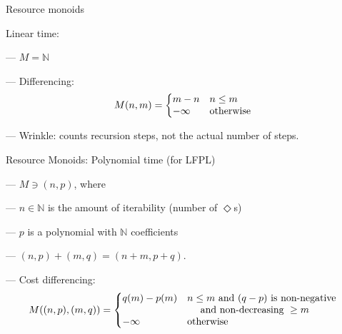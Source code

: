 \documentclass[xetex,serif,mathserif,aspectratio=169]{beamer}
\newcommand{\youtem}{\quad \textcolor{titlered!80}{---} \quad}
\newcommand{\HEAD}[1]{\textcolor{titlered}{#1}}
\begin{document}
\begin{frame}
  \HEAD{Resource monoids}

  \bigskip

  Linear time:

  \bigskip

  \youtem $M = \mathbb{N}$

  \smallskip

  \youtem Differencing:
  \begin{displaymath}
    M(n,m) = \left\{\begin{array}{@{}ll} m - n & n \leq m \\ -\infty & \textrm{otherwise} \end{array}\right.
  \end{displaymath}


  \youtem Wrinkle: counts recursion steps, not the actual number of
  steps.
\end{frame}

\begin{frame}
  \HEAD{Resource Monoids: } Polynomial time (for LFPL)

  \bigskip

  \youtem $M \ni (n, p)$, where \\

  \smallskip

  \quad \youtem $n \in \mathbb{N}$ is the amount of iterability (number of $\Diamond$s)

  \smallskip

  \quad \youtem $p$ is a polynomial with $\mathbb{N}$ coefficients

  \smallskip

  \quad \youtem $(n,p)+(m,q) = (n+m,p+q)$.

  \smallskip

  \quad \youtem Cost differencing:
  \begin{displaymath}
    M((n,p),(m,q)) = \left\{\begin{array}{@{}ll}
                              q(m) - p(m) & n \leq m\textrm{ and }(q-p)\textrm{ is non-negative}\\
                              &\quad\textrm{ and non-decreasing }\geq m \\
                              -\infty      & \textrm{otherwise}
                            \end{array}\right.
                        \end{displaymath}

  \bigskip

\end{frame}
\end{document}

